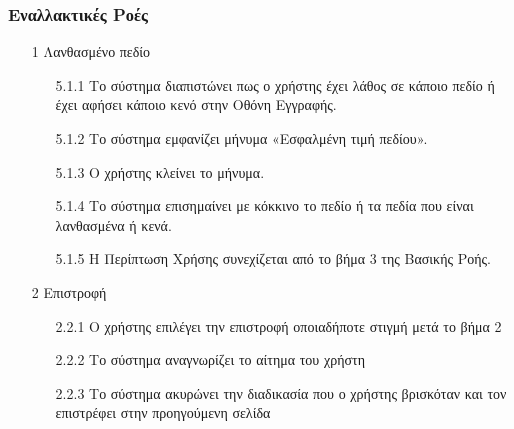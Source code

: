 \documentclass[12pt,a4paper,twoside]{book}
\begin{document}
\subsubsection{Εναλλακτικές Ροές}
\begin{enumerate}
  \item[1 ] Λανθασμένο πεδίο  %
        \begin{enumerate}
          \item[5.1.1 ] Το σύστημα διαπιστώνει πως ο χρήστης έχει λάθος σε κάποιο πεδίο ή έχει αφήσει κάποιο κενό στην Οθόνη Εγγραφής. %
          \item[5.1.2 ] Το σύστημα εμφανίζει μήνυμα «Εσφαλμένη τιμή πεδίου». %
          \item[5.1.3 ] Ο χρήστης κλείνει το μήνυμα. %
          \item[5.1.4 ] Το σύστημα επισημαίνει με κόκκινο το πεδίο ή τα πεδία που είναι λανθασμένα ή κενά. %
          \item[5.1.5 ] Η Περίπτωση Χρήσης συνεχίζεται από το βήμα 3 της Βασικής Ροής.
        \end{enumerate}
  \item[2 ] Επιστροφή
        \begin{enumerate}
          \item[2.2.1 ] Ο χρήστης επιλέγει την επιστροφή οποιαδήποτε στιγμή μετά το βήμα 2 %
          \item[2.2.2 ] Το σύστημα αναγνωρίζει το αίτημα του χρήστη %
          \item[2.2.3 ] Το σύστημα ακυρώνει την διαδικασία που ο χρήστης βρισκόταν και τον επιστρέφει στην προηγούμενη σελίδα %
        \end{enumerate}
\end{enumerate}
\end{document}
